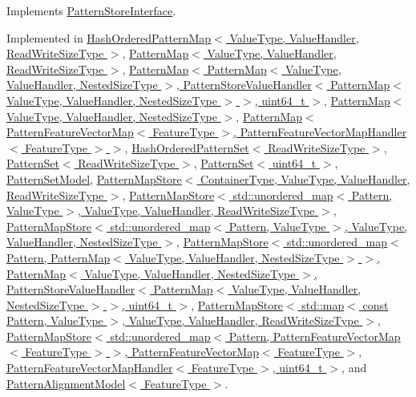 Implements \hyperlink{classPatternStoreInterface_a225c319d318aad157512cd0001b05eb2}{Pattern\+Store\+Interface}.



Implemented in \hyperlink{classHashOrderedPatternMap_a5a48798964b7d667950f41630d3bf708}{Hash\+Ordered\+Pattern\+Map$<$ Value\+Type, Value\+Handler, Read\+Write\+Size\+Type $>$}, \hyperlink{classPatternMap_aed30070f31256d0c1335fa9bd3b5db1c}{Pattern\+Map$<$ Value\+Type, Value\+Handler, Read\+Write\+Size\+Type $>$}, \hyperlink{classPatternMap_aed30070f31256d0c1335fa9bd3b5db1c}{Pattern\+Map$<$ Pattern\+Map$<$ Value\+Type, Value\+Handler, Nested\+Size\+Type $>$, Pattern\+Store\+Value\+Handler$<$ Pattern\+Map$<$ Value\+Type, Value\+Handler, Nested\+Size\+Type $>$ $>$, uint64\+\_\+t $>$}, \hyperlink{classPatternMap_aed30070f31256d0c1335fa9bd3b5db1c}{Pattern\+Map$<$ Value\+Type, Value\+Handler, Nested\+Size\+Type $>$}, \hyperlink{classPatternMap_aed30070f31256d0c1335fa9bd3b5db1c}{Pattern\+Map$<$ Pattern\+Feature\+Vector\+Map$<$ Feature\+Type $>$, Pattern\+Feature\+Vector\+Map\+Handler$<$ Feature\+Type $>$ $>$}, \hyperlink{classHashOrderedPatternSet_a42fee5ee6f163edf807623ffc6ab2617}{Hash\+Ordered\+Pattern\+Set$<$ Read\+Write\+Size\+Type $>$}, \hyperlink{classPatternSet_af85860d7135a5154a01a8366131beb39}{Pattern\+Set$<$ Read\+Write\+Size\+Type $>$}, \hyperlink{classPatternSet_af85860d7135a5154a01a8366131beb39}{Pattern\+Set$<$ uint64\+\_\+t $>$}, \hyperlink{classPatternSetModel_aa19ae308dbc4bf1db35be6ba7ff4769b}{Pattern\+Set\+Model}, \hyperlink{classPatternMapStore_ab6dc590b4b102f1464301a3fc6c4ec73}{Pattern\+Map\+Store$<$ Container\+Type, Value\+Type, Value\+Handler, Read\+Write\+Size\+Type $>$}, \hyperlink{classPatternMapStore_ab6dc590b4b102f1464301a3fc6c4ec73}{Pattern\+Map\+Store$<$ std\+::unordered\+\_\+map$<$ Pattern, Value\+Type $>$, Value\+Type, Value\+Handler, Read\+Write\+Size\+Type $>$}, \hyperlink{classPatternMapStore_ab6dc590b4b102f1464301a3fc6c4ec73}{Pattern\+Map\+Store$<$ std\+::unordered\+\_\+map$<$ Pattern, Value\+Type $>$, Value\+Type, Value\+Handler, Nested\+Size\+Type $>$}, \hyperlink{classPatternMapStore_ab6dc590b4b102f1464301a3fc6c4ec73}{Pattern\+Map\+Store$<$ std\+::unordered\+\_\+map$<$ Pattern, Pattern\+Map$<$ Value\+Type, Value\+Handler, Nested\+Size\+Type $>$ $>$, Pattern\+Map$<$ Value\+Type, Value\+Handler, Nested\+Size\+Type $>$, Pattern\+Store\+Value\+Handler$<$ Pattern\+Map$<$ Value\+Type, Value\+Handler, Nested\+Size\+Type $>$ $>$, uint64\+\_\+t $>$}, \hyperlink{classPatternMapStore_ab6dc590b4b102f1464301a3fc6c4ec73}{Pattern\+Map\+Store$<$ std\+::map$<$ const Pattern, Value\+Type $>$, Value\+Type, Value\+Handler, Read\+Write\+Size\+Type $>$}, \hyperlink{classPatternMapStore_ab6dc590b4b102f1464301a3fc6c4ec73}{Pattern\+Map\+Store$<$ std\+::unordered\+\_\+map$<$ Pattern, Pattern\+Feature\+Vector\+Map$<$ Feature\+Type $>$ $>$, Pattern\+Feature\+Vector\+Map$<$ Feature\+Type $>$, Pattern\+Feature\+Vector\+Map\+Handler$<$ Feature\+Type $>$, uint64\+\_\+t $>$}, and \hyperlink{classPatternAlignmentModel_a7e4b2a69fd2e0852af0ed6ffaf6c51dc}{Pattern\+Alignment\+Model$<$ Feature\+Type $>$}.

